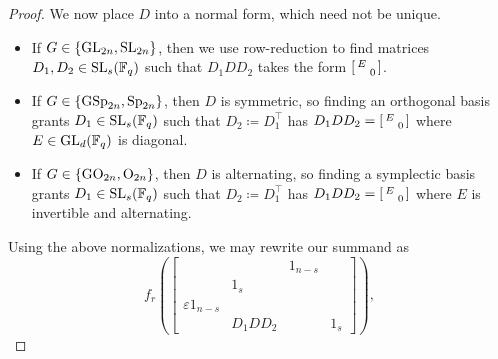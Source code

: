 \begin{proof}
	We now place $D$ into a normal form, which need not be unique.
	\begin{itemize}
		\item If $G\in\{\mathrm{GL}_{2n},\mathrm{SL}_{2n}\}$, then we use row-reduction to find matrices $D_1,D_2\in\mathrm{SL}_{s}(\mathbb F_q)$ such that $D_1DD_2$ takes the form $\begin{bsmallmatrix}
			E \\ & 0
		\end{bsmallmatrix}$. %
		\item If $G\in\{\mathrm{GSp}_{2n},\mathrm{Sp}_{2n}\}$, then $D$ is symmetric, so finding an orthogonal basis grants $D_1\in\mathrm{SL}_s(\mathbb F_q)$ such that $D_2\coloneqq D_1^\intercal$ has $D_1DD_2=\begin{bsmallmatrix}
			E \\ & 0
		\end{bsmallmatrix}$ where $E\in\mathrm{GL}_d(\mathbb F_q)$ is diagonal.
		\item If $G\in\{\mathrm{GO}_{2n},\mathrm{O}_{2n}\}$, then $D$ is alternating, so finding a symplectic basis
        grants $D_1\in\mathrm{SL}_s(\mathbb F_q)$ such that $D_2\coloneqq D_1^\intercal$ has $D_1DD_2=\begin{bsmallmatrix}
			E \\ & 0
		\end{bsmallmatrix}$ where $E$ is invertible and alternating.
	\end{itemize}
    Using the above normalizations, we may rewrite our summand as
    \[f_r\left(\begin{bmatrix}
		&& 1_{n-s} \\ & 1_s \\
		\varepsilon1_{n-s} &   &   \\ & D_1 DD_2 &   & 1_s
	\end{bmatrix}\right),\]

\end{proof}
